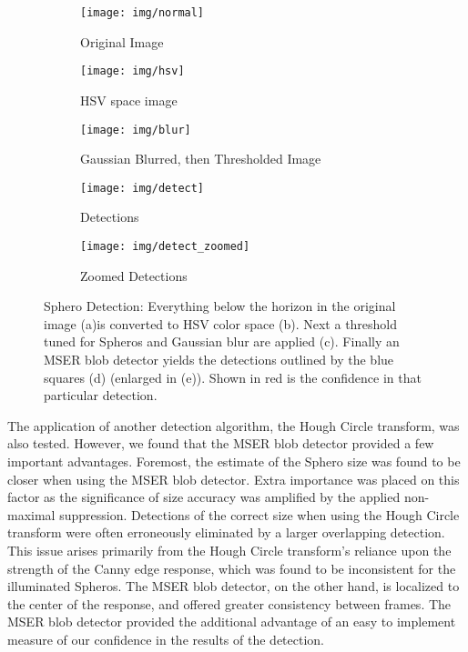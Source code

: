 \begin{figure}[th!]
	\centering
	\begin{subfigure}[b]{0.4\textwidth}
		\texttt{[image: img/normal]}
		\caption{Original Image}
	\end{subfigure}

	\begin{subfigure}[b]{0.4\textwidth}
		\texttt{[image: img/hsv]}
		\caption{HSV space image}
	\end{subfigure}

	\begin{subfigure}[b]{0.4\textwidth}
		\texttt{[image: img/blur]}
		\caption{Gaussian Blurred, then Thresholded Image}
	\end{subfigure}

	\begin{subfigure}[b]{0.4\textwidth}
		\texttt{[image: img/detect]}
		\caption{Detections}
	\end{subfigure}
	
	\begin{subfigure}[b]{0.4\textwidth}
		\texttt{[image: img/detect\_zoomed]}
		\caption{Zoomed Detections}
	\end{subfigure}
	
	\caption{Sphero Detection: Everything below the horizon in the original image (a)is converted to HSV color space (b).  Next
	a threshold tuned for Spheros and Gaussian blur are applied (c).  Finally an MSER blob detector yields the detections
	outlined by the blue squares (d) (enlarged in (e)).  Shown in red is the confidence in that particular detection.}
	\label{fig:blob-results}
\end{figure}

The application of another detection algorithm, the Hough Circle transform, was also tested. However, we found that the MSER
blob detector provided a few important advantages. Foremost, the estimate of the Sphero size was found to be closer when
using the MSER blob detector. Extra importance was placed on this factor as the significance of size accuracy was amplified by
the applied non-maximal suppression. Detections of the correct size when using the Hough Circle transform were often
erroneously eliminated by a larger overlapping detection. This issue arises primarily from the Hough Circle transform's reliance
upon the strength of the Canny edge response, which was found to be inconsistent for the illuminated Spheros. The MSER blob
detector, on the other hand, is localized to the center of the response, and offered greater consistency between frames. The
MSER blob detector provided the additional advantage of an easy to implement measure of our confidence in the results of the
detection.

